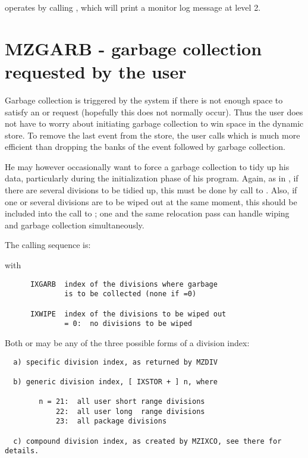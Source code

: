  operates by calling , which will print a monitor
log message at level 2.

\section{MZGARB - garbage collection requested by the user}

Garbage collection is triggered by the system if there is not
enough space to satisfy an  or  request
(hopefully this does not normally occur).
Thus the user does not have to worry about initiating
garbage collection to win space in the dynamic store.
To remove the last event from the store,
the user calls  which is much more efficient
than dropping the banks of the event followed by garbage collection.

He may however occasionally want to force a garbage collection
to tidy up his data,
particularly during the initialization phase of his program.
Again, as in , if there are several divisions to be tidied up,
this must be done by  call to .
Also,
if one or several divisions are to be wiped out at the same moment,
this should be included into the call to ;
one and the same relocation pass can handle wiping
and garbage collection simultaneously.

The calling sequence is:


with
\begin{verbatim}
      IXGARB  index of the divisions where garbage
              is to be collected (none if =0)

      IXWIPE  index of the divisions to be wiped out
              = 0:  no divisions to be wiped
\end{verbatim} 

Both  or  may be any of the three possible forms
of a division index:
\begin{verbatim}
  a) specific division index, as returned by MZDIV

  b) generic division index, [ IXSTOR + ] n, where

        n = 21:  all user short range divisions
            22:  all user long  range divisions
            23:  all package divisions

  c) compound division index, as created by MZIXCO, see there for details.
\end{verbatim} 

